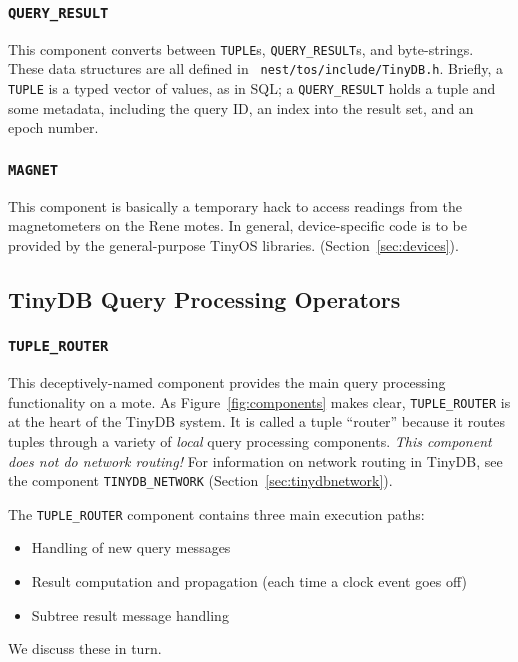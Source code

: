 \documentclass[11pt]{article}
\begin{document}
\subsubsection {\tt QUERY\_RESULT}
This component converts between {\tt TUPLE}s, {\tt QUERY\_RESULT}s,
and byte-strings.  These data structures are all defined in {\tt
nest/tos/include/TinyDB.h}.  Briefly, a {\tt TUPLE} is a typed vector
of values, as in SQL; a {\tt QUERY\_RESULT} holds a tuple and some
metadata, including the query ID, an index into the result set, and an
epoch number.

\subsubsection {\tt MAGNET}
This component is basically a temporary hack to access readings from
the magnetometers on the Rene motes.  In general, device-specific code
is to be provided by the general-purpose TinyOS libraries.
(Section~\ref{sec:devices}).


\subsection{TinyDB Query Processing Operators}
\label{sec:qp}
\subsubsection {\tt TUPLE\_ROUTER}
This deceptively-named component provides the main query processing
functionality on a mote.  As Figure~\ref{fig:components} makes clear,
{\tt TUPLE\_ROUTER} is at the heart of the TinyDB system.  It is called
a tuple ``router'' because it routes tuples through a variety of {\em
local} query processing components.
{\em This component does not do network
routing!}  For information on network routing in TinyDB, see the
component {\tt TINYDB\_NETWORK} (Section~\ref{sec:tinydbnetwork}).

The {\tt TUPLE\_ROUTER} component contains three main execution
paths:
\begin{itemize}
\item Handling of new query messages
\item Result computation and propagation (each time a clock event goes off)
\item Subtree result message handling
\end{itemize}
We discuss these in turn.
\end{document}
